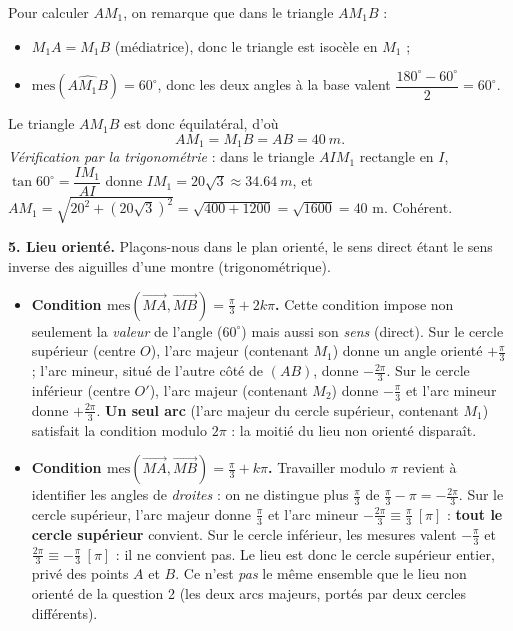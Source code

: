 \documentclass[11pt]{article}
\newcommand{\cle}[1]{{\popxbold\color{popdark}#1}}
\begin{document}
\begin{exoresolu}
Pour calculer $AM_1$, on remarque que dans le triangle $AM_1B$ :
\begin{itemize}
\item $M_1A = M_1B$ (médiatrice), donc le triangle est isocèle en $M_1$ ;
\item $\mathrm{mes}(\widehat{AM_1B}) = 60^{\circ}$, donc les deux angles à la base valent $\dfrac{180^{\circ} - 60^{\circ}}{2} = 60^{\circ}$.
\end{itemize}
Le triangle $AM_1B$ est donc \cle{équilatéral}, d'où
\[ AM_1 = M_1B = AB = \SI{40}{m}. \]
\emph{Vérification par la trigonométrie} : dans le triangle $AIM_1$ rectangle en $I$, $\tan 60^{\circ} = \dfrac{IM_1}{AI}$ donne $IM_1 = 20\sqrt{3} \approx \SI{34,64}{m}$, et $AM_1 = \sqrt{20^2 + (20\sqrt{3})^2} = \sqrt{400 + 1200} = \sqrt{1600} = 40$ m. Cohérent.

\textbf{5. Lieu orienté.} Plaçons-nous dans le plan orienté, le sens direct étant le sens inverse des aiguilles d'une montre (trigonométrique).
\begin{itemize}
\item \textbf{Condition $\mathrm{mes}(\overrightarrow{MA},\overrightarrow{MB}) = \frac{\pi}{3} + 2k\pi$.} Cette condition impose non seulement la \emph{valeur} de l'angle ($60^{\circ}$) mais aussi son \emph{sens} (direct). Sur le cercle supérieur (centre $O$), l'arc majeur (contenant $M_1$) donne un angle orienté $+\frac{\pi}{3}$ ; l'arc mineur, situé de l'autre côté de $(AB)$, donne $-\frac{2\pi}{3}$. Sur le cercle inférieur (centre $O'$), l'arc majeur (contenant $M_2$) donne $-\frac{\pi}{3}$ et l'arc mineur donne $+\frac{2\pi}{3}$. \textbf{Un seul arc} (l'arc majeur du cercle supérieur, contenant $M_1$) satisfait la condition modulo $2\pi$ : la moitié du lieu non orienté disparaît.
\item \textbf{Condition $\mathrm{mes}(\overrightarrow{MA},\overrightarrow{MB}) = \frac{\pi}{3} + k\pi$.} Travailler modulo $\pi$ revient à identifier les angles de \emph{droites} : on ne distingue plus $\frac{\pi}{3}$ de $\frac{\pi}{3}-\pi = -\frac{2\pi}{3}$. Sur le cercle supérieur, l'arc majeur donne $\frac{\pi}{3}$ et l'arc mineur $-\frac{2\pi}{3} \equiv \frac{\pi}{3}\ [\pi]$ : \textbf{tout le cercle supérieur} convient. Sur le cercle inférieur, les mesures valent $-\frac{\pi}{3}$ et $\frac{2\pi}{3} \equiv -\frac{\pi}{3}\ [\pi]$ : il ne convient pas. Le lieu est donc le cercle supérieur entier, privé des points $A$ et $B$. Ce n'est \emph{pas} le même ensemble que le lieu non orienté de la question 2 (les deux arcs majeurs, portés par deux cercles différents).
\end{itemize}


\end{exoresolu}
\end{document}
